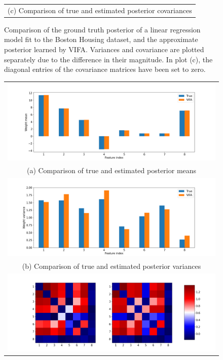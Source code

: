 \documentclass[msc,deptreport.inf]{infthesis} %
\begin{document}
\begin{figure}[!htbp]
\begin{tabular}{c}
		(c) Comparison of true and estimated posterior covariances \\[6pt] 
	\end{tabular}
	\caption{Comparison of the ground truth posterior of a linear regression model fit to the Boston Housing dataset, and the approximate posterior learned by VIFA. Variances and covariance are plotted separately due to the difference in their magnitude. In plot (c), the diagonal entries of the covariance matrices have been set to zero.}
	\label{fig:posterior_boston_housing}
\end{figure}

\begin{figure}[!htbp] 
	\begin{tabular}{c}
		\includegraphics[width=140mm]{plots/concrete_strength_posterior_mean.png} \\
		(a) Comparison of true and estimated posterior means \\[6pt] 
		 \includegraphics[width=140mm]{plots/concrete_strength_posterior_variance.png} \\
		(b) Comparison of true and estimated posterior variances \\[6pt] 
		\includegraphics[width=140mm]{plots/concrete_strength_posterior_covariance.png} \\

\end{tabular}
\end{figure}
\end{document}
